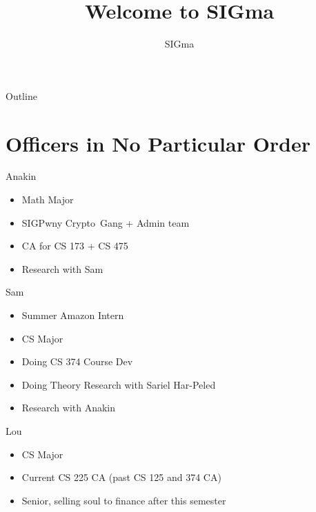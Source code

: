 \documentclass[aspectratio=169]{beamer}
\title{Welcome to SIGma}
\subtitle{}
\author{SIGma}
\date{}
\begin{document}

\begin{frame}
\titlepage
\end{frame}

\begin{frame}{Outline}
  \tableofcontents
\end{frame}

\section{Officers in No Particular Order}

\begin{frame}{Anakin} 
        \begin{itemize}
        \item Math Major
        \item SIGPwny Crypto\footnotemark\ Gang + Admin team
        \item CA for CS 173 + CS 475
        \item Research with Sam
    \end{itemize}
\end{frame}

\begin{frame}{Sam}
    \begin{itemize}
        \item Summer Amazon Intern
        \item CS Major
        \item Doing CS 374 Course Dev
        \item Doing Theory Research with Sariel Har-Peled
        \item Research with Anakin
    \end{itemize}
\end{frame}

\begin{frame}{Lou}
\begin{itemize}
    \item CS Major
    \item Current CS 225 CA (past CS 125 and 374 CA)
    \item Senior, selling soul to finance after this semester
\end{itemize}
\end{frame}
\end{document}
